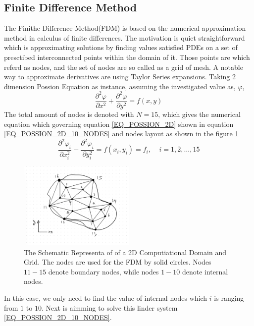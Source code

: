 \subsection{Finite Difference Method}\label{SEC:FDM}
The Finithe Difference Method(FDM) is based on the numerical approximation method in calculus of finite differences.
The motivation is quiet straightforward which is approximating solutions by finding values satisfied PDEs on a set of 
presctibed interconnected points within the domain of it. Those points are which referd as nodes, and the set of nodes 
are so called as a grid of mesh.
A notable way to approximate derivatives are using 
Taylor Series expansions.
Taking 2 dimension Possion Equation as instance, assuming the investigated value as, $\varphi$,
\begin{equation}\label{EQ_POSSION_2D}
  \frac{
    \partial ^ 2 \varphi  
  }{
    \partial x ^ 2
  } +
  \frac{
    \partial ^ 2 \varphi  
  }{
    \partial y ^ 2
  }
  =  f(x,y)
\end{equation}
The total amount of nodes is denoted with $N = 15$, which gives the numerical equation which governing 
equation \ref{EQ_POSSION_2D} 
shown in 
equation \ref{EQ_POSSION_2D_10_NODES} and nodes layout as shown in the 
figure \ref{FIG_POSSION_2D_10_NODES}
\begin{equation}\label{EQ_POSSION_2D_10_NODES}
  \frac{
    \partial ^ 2 \varphi_i
  }{
    \partial x_i ^ 2
  } +
  \frac{
    \partial ^ 2 \varphi_i
  }{
    \partial y_i ^ 2
  }
  =  f(x_i,y_i) = f_i, \:\:\:\:\: i = 1,2,\dots,15
\end{equation}
\begin{figure}[htbp]
  \centering
  \includegraphics[width=0.5\textwidth]{figure/FIG_POSSION_2D_10_NODES.jpg}
  \caption{The Schematic Representa of of a 2D Computiational Domain and Grid. The nodes are used for the FDM by solid circles. 
  Nodes $11-15$ denote boundary nodes, while nodes $1-10$ denote internal nodes.}
  \label{FIG_POSSION_2D_10_NODES}
\end{figure}
In this case, we only need to find the value of internal nodes which $i$ is ranging from $1$ to $10$.
Next is aimming to solve this linder system \ref{EQ_POSSION_2D_10_NODES}.


